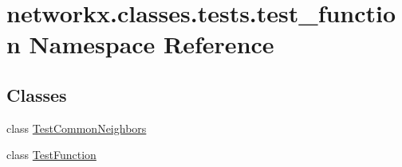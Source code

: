 \hypertarget{namespacenetworkx_1_1classes_1_1tests_1_1test__function}{}\section{networkx.\+classes.\+tests.\+test\+\_\+function Namespace Reference}
\label{namespacenetworkx_1_1classes_1_1tests_1_1test__function}
\subsection*{Classes}
\begin{DoxyCompactItemize}
\item 
class \hyperlink{classnetworkx_1_1classes_1_1tests_1_1test__function_1_1TestCommonNeighbors}{Test\+Common\+Neighbors}
\item 
class \hyperlink{classnetworkx_1_1classes_1_1tests_1_1test__function_1_1TestFunction}{Test\+Function}
\end{DoxyCompactItemize}
